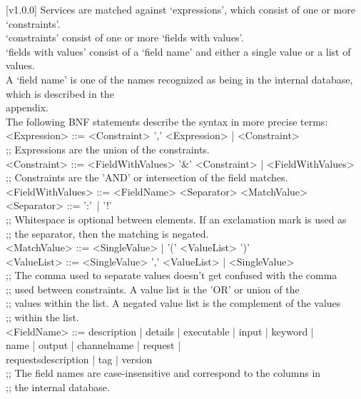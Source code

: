 [v1.0.0]
%
Services are matched against `expressions', which consist of one or more
`constraints'.\\
`constraints' consist of one or more `fields with values'.\\
`fields with values' consist of a `field name' and either a single value or a list of
values.\\
A `field name' is one of the names recognized as being in the internal database, which is
described in the\\
 appendix.\\

The following BNF statements describe the syntax in more precise terms:
\outputBegin{}
<Expression> ::= <Constraint> ',' <Expression> | <Constraint>\\
;; Expressions are the union of the constraints.\\

<Constraint> ::= <FieldWithValues> '\&' <Constraint> | <FieldWithValues>\\
;; Constraints are the 'AND' or intersection of the field matches.\\

<FieldWithValues> ::= <FieldName> <Separator> <MatchValue>\\
<Separator> ::= ':'\ | '!'\\
;; Whitespace is optional between elements. If an exclamation mark is used as\\
;; the separator, then the matching is negated.\\

<MatchValue> ::= <SingleValue> | '(' <ValueList> ')'\\
<ValueList> ::= <SingleValue> ',' <ValueList> | <SingleValue>\\
;; The comma used to separate values doesn't get confused with the comma\\
;; used between constraints. A value list is the 'OR' or union of the\\
;; values within the list. A negated value list is the complement of the values\\
;; within the list.\\

\settowidth{\utilLen}{<FieldName> ::= }%
<FieldName> ::= description | details | executable | input | keyword |\\
\hspace*{\utilLen}name | output | channelname | request |\\
\hspace*{\utilLen}requestsdescription | tag | version\\
;; The field names are case-insensitive and correspond to the columns in\\
;; the internal database.\\

